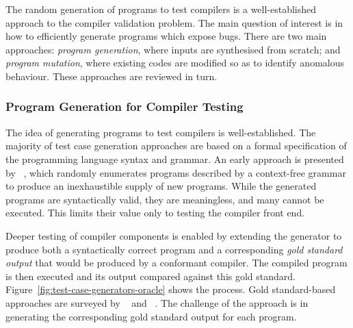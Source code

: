 The random generation of programs to test compilers is a well-established approach to the compiler validation problem. The main question of interest is in how to efficiently generate programs which expose bugs. There are two main approaches: \emph{program generation}, where inputs are synthesised from scratch; and \emph{program mutation}, where existing codes are modified so as to identify anomalous behaviour. These approaches are reviewed in turn.


\subsubsection{Program Generation for Compiler Testing}

The idea of generating programs to test compilers is well-established. The majority of test case generation approaches are based on a formal specification of the programming language syntax and grammar.
An early approach is presented by \citeauthor{Hanford1970a}~\cite{Hanford1970a}, which randomly enumerates programs described by a context-free grammar to produce an inexhaustible supply of new programs. While the generated programs are syntactically valid, they are meaningless, and many cannot be executed. This limits their value only to testing the compiler front end.

Deeper testing of compiler components is enabled by extending the generator to produce both a syntactically correct program and a corresponding \emph{gold standard output} that would be produced by a conformant compiler. The compiled program is then executed and its output compared against this gold standard. Figure~\ref{fig:test-case-generators-oracle} shows the process. Gold standard-based approaches are surveyed by \citeauthor{Boujarwah1997}~\cite{Boujarwah1997} and \citeauthor{Kossatchev2005}~\cite{Kossatchev2005}. The challenge of the approach is in generating the corresponding gold standard output for each program.

